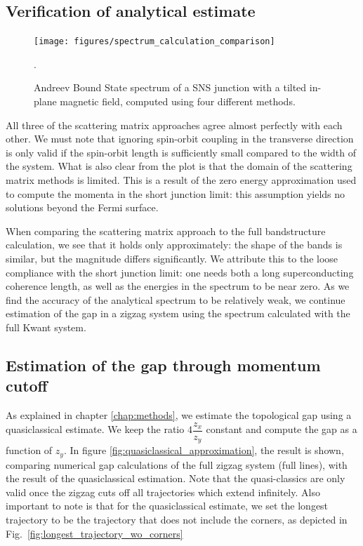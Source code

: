 		\subsection{Verification of analytical estimate}
			\begin{figure}[!htb]
			\centering
			\texttt{[image: figures/spectrum\_calculation\_comparison]}
			\caption{Andreev Bound State spectrum of a SNS junction with a tilted in-plane magnetic field, computed using four different methods.}.
			\label{fig:spectrum_calculation_comparison}
			\end{figure}

			All three of the scattering matrix approaches agree almost perfectly with each other.
			We must note that ignoring spin-orbit coupling in the transverse direction is only valid if the spin-orbit length is sufficiently small compared to the width of the system.
			What is also clear from the plot is that the domain of the scattering matrix methods is limited.
			This is a result of the zero energy approximation used to compute the momenta in the short junction limit: this assumption yields no solutions beyond the Fermi surface.

			When comparing the scattering matrix approach to the full bandstructure calculation, we see that it holds only approximately: the shape of the bands is similar, but the magnitude differs significantly.
			We attribute this to the loose compliance with the short junction limit: one needs both a long superconducting coherence length, as well as the energies in the spectrum to be near zero.
			As we find the accuracy of the analytical spectrum to be relatively weak, we continue estimation of the gap in a zigzag system using the spectrum calculated with the full Kwant system.

		\subsection{Estimation of the gap through momentum cutoff}
			As explained in chapter \ref{chap:methods}, we estimate the topological gap using a quasiclassical estimate.
			We keep the ratio $4\dfrac{z_x}{z_y}$ constant and compute the gap as a function of $z_y$.
			In figure \ref{fig:quasiclassical_approximation}, the result is shown, comparing numerical gap calculations of the full zigzag system (full lines), with the result of the quasiclassical estimation.
			Note that the quasi-classics are only valid once the zigzag cuts off all trajectories which extend infinitely.
			Also important to note is that for the quasiclassical estimate, we set the longest trajectory to be the trajectory that does not include the corners, as depicted in Fig.~\ref{fig:longest_trajectory_wo_corners}

